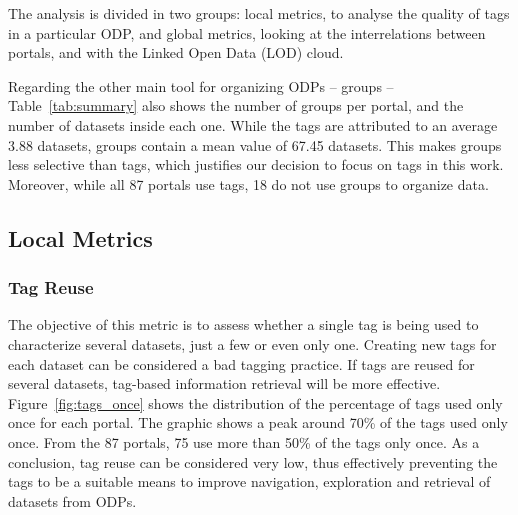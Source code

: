 
The analysis is divided in two groups: local metrics, to analyse the quality of tags in a particular ODP, and global metrics, looking at the interrelations between portals, and with the Linked Open Data (LOD) cloud.

Regarding the other main tool for organizing ODPs -- groups -- Table~\ref{tab:summary} also shows the number of groups per portal, and the number of datasets inside each one.
While the tags are attributed to an average 3.88 datasets, groups contain a mean value of 67.45 datasets.
This makes groups less selective than tags, which justifies our decision to focus on tags in this work.
Moreover, while all 87 portals use tags, 18 do not use groups to organize data.

\subsection{Local Metrics}
\label{sec:local_metrics}

\subsubsection{Tag Reuse}
The objective of this metric is to assess whether a single tag is being used to characterize several datasets, just a few or even only one.
Creating new tags for each dataset can be considered a bad tagging practice.
If tags are reused for several datasets, tag-based information retrieval will be more effective.
Figure~\ref{fig:tags_once} shows the distribution of the percentage of tags used only once for each portal. 
The graphic shows a peak around 70\% of the tags used only once.
From the 87 portals, 75 use more than 50\% of the tags only once.
As a conclusion, tag reuse can be considered very low, thus effectively preventing the tags to be a suitable means to improve navigation, exploration and retrieval of datasets from ODPs.

